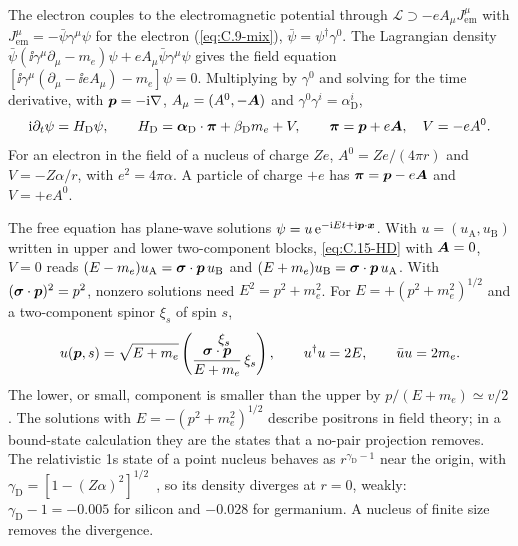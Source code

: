 The electron couples to the electromagnetic potential through $\mathcal{L} \supset -eA_\mu J^\mu_{\mathrm{em}}$ with $J^\mu_{\mathrm{em}} = -\bar\psi\gamma^\mu\psi$ for the electron (\cref{eq:C.9-mix}), $\bar\psi = \psi^\dagger\gamma^0$. The Lagrangian density $\bar\psi(\ii\gamma^\mu\partial_\mu - m_e)\psi + eA_\mu\bar\psi\gamma^\mu\psi$ gives the field equation $[\ii\gamma^\mu(\partial_\mu - \ii eA_\mu) - m_e]\psi = 0$. Multiplying by $\gamma^0$ and solving for the time derivative, with $\bm{p} = -\mathrm{i}\nabla$, $A_\mu = (A^0, -\bm{A})$ and $\gamma^0\gamma^i = \alpha_{\mathrm{D}}^i$,
\begin{equation}
  \mathrm{i}\partial_t\psi = H_{\mathrm{D}}\psi, \qquad
  H_{\mathrm{D}} = \boldsymbol{\alpha}_{\mathrm{D}}\cdot\boldsymbol{\pi} + \beta_{\mathrm{D}}m_e + V, \qquad
  \boldsymbol{\pi} = \bm{p} + e\bm{A}, \quad V = -eA^0 .
  \label{eq:C.15-HD}
\end{equation}
For an electron in the field of a nucleus of charge $Ze$, $A^0 = Ze/(4\pi r)$ and $V = -Z\alpha/r$, with $e^2 = 4\pi\alpha$. A particle of charge $+e$ has $\boldsymbol{\pi} = \bm{p} - e\bm{A}$ and $V = +eA^0$.

The free equation has plane-wave solutions $\psi = u\,\mathrm{e}^{-\mathrm{i} E t + \mathrm{i}\bm{p}\cdot\bm{x}}$. With $u = (u_{\mathrm{A}}, u_{\mathrm{B}})$ written in upper and lower two-component blocks, \cref{eq:C.15-HD} with $\bm{A} = 0$, $V = 0$ reads $(E - m_e)u_{\mathrm{A}} = \boldsymbol{\sigma}\cdot\bm{p}\,u_{\mathrm{B}}$ and $(E + m_e)u_{\mathrm{B}} = \boldsymbol{\sigma}\cdot\bm{p}\,u_{\mathrm{A}}$. With $(\boldsymbol{\sigma}\cdot\bm{p})^2 = p^2$, nonzero solutions need $E^2 = p^2 + m_e^2$. For $E = +(p^2 + m_e^2)^{1/2}$ and a two-component spinor $\xi_s$ of spin $s$,
\begin{equation}
  u(\bm{p}, s) = \sqrt{E + m_e}\begin{pmatrix} \xi_s\\ \dfrac{\boldsymbol{\sigma}\cdot\bm{p}}{E + m_e}\,\xi_s \end{pmatrix}, \qquad
  u^\dagger u = 2E, \qquad \bar uu = 2m_e .
  \label{eq:C.15-spinor}
\end{equation}
The lower, or small, component is smaller than the upper by $p/(E + m_e) \simeq v/2$. The solutions with $E = -(p^2 + m_e^2)^{1/2}$ describe positrons in field theory; in a bound-state calculation they are the states that a no-pair projection removes. The relativistic 1s state of a point nucleus behaves as $r^{\gamma_{\mathrm{D}} - 1}$ near the origin, with $\gamma_{\mathrm{D}} = [1 - (Z\alpha)^2]^{1/2}$~\cite{bjorken1964relativistic}, so its density diverges at $r = 0$, weakly: $\gamma_{\mathrm{D}} - 1 = -0.005$ for silicon and $-0.028$ for germanium. A nucleus of finite size removes the divergence.

